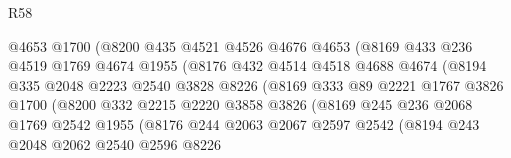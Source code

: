 \begin{lexlean}{R58}
\begin{coremodule}
                            @4653
                            @1700
                            (@8200
                              @435
                              @4521
                              @4526
                              @4676
                              @4653
                              (@8169
                                @433
                                @236
                                @4519
                                @1769
                                @4674
                                @1955
                                (@8176
                                  @432
                                  @4514
                                  @4518
                                  @4688
                                  @4674
                                  (@8194
                                    @335
                                    @2048
                                    @2223
                                    @2540
                                    @3828
                                    @8226
                                    (@8169
                                      @333
                                      @89
                                      @2221
                                      @1767
                                      @3826
                                      @1700
                                      (@8200
                                        @332
                                        @2215
                                        @2220
                                        @3858
                                        @3826
                                        (@8169
                                          @245
                                          @236
                                          @2068
                                          @1769
                                          @2542
                                          @1955
                                          (@8176
                                            @244
                                            @2063
                                            @2067
                                            @2597
                                            @2542
                                            (@8194
                                              @243
                                              @2048
                                              @2062
                                              @2540
                                              @2596
                                              @8226

\end{coremodule}
\end{lexlean}
